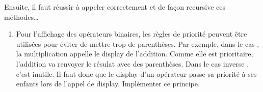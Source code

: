 \documentclass[letterpaper,10pt,english]{sphinxhowto}
\begin{document}
\begin{sphinxVerbatim}[commandchars=\\\{\}]
 
      
      

     
            
                         
               

     

      \PYG{p}{[} 
                    \PYG{p}{]} 
\end{sphinxVerbatim}

\sphinxAtStartPar
Ensuite, il faut réussir à appeler correctement et de façon recursive ces méthodes…
\begin{enumerate}
%
\setcounter{enumi}{9}
\item {} 
\sphinxAtStartPar
Pour l’affichage des opérateurs binaires, les règles de priorité peuvent être utilisées pour éviter de mettre trop de parenthèses. Par exemple, dans le cas , la multiplication appelle le display de l’addition. Comme elle est prioritaire, l’addition va renvoyer le résulat avec des parenthèses. Dans le cas inverse , c’est inutile. Il faut donc que le display d’un opérateur passe sa priorité à ses enfants lors de l’appel de display. Implémenter ce principe.

\end{enumerate}
\end{document}
